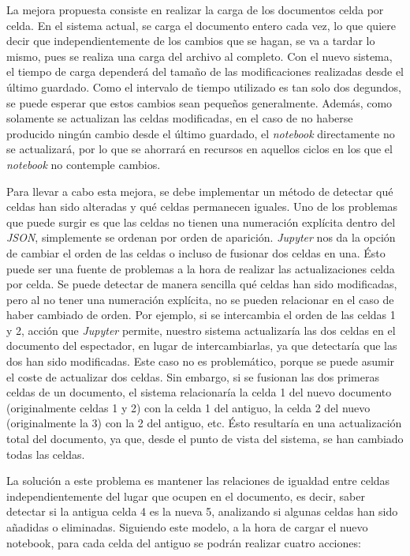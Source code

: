 \documentclass[11pt,spanish,listoffigures]{tfgetsinf}
\begin{document}
La mejora propuesta consiste en realizar la carga de los documentos celda por celda. En el sistema actual, se carga el documento entero cada vez, lo que quiere decir que independientemente de los cambios que se hagan, se va a tardar lo mismo, pues se realiza una carga del archivo al completo. Con el nuevo sistema, el tiempo de carga dependerá del tamaño de las modificaciones realizadas desde el último guardado. Como el intervalo de tiempo utilizado es tan solo dos degundos, se puede esperar que estos cambios sean pequeños generalmente. Además, como solamente se actualizan las celdas modificadas, en el caso de no haberse producido ningún cambio desde el último guardado, el \textit{notebook} directamente no se actualizará, por lo que se ahorrará en recursos en aquellos  ciclos en los que el \textit{notebook} no contemple cambios.

Para llevar a cabo esta mejora, se debe implementar un método de detectar qué celdas han sido alteradas y qué celdas permanecen iguales. Uno de los problemas que puede surgir es que las celdas no tienen una numeración explícita dentro del \textit{JSON}, simplemente se ordenan por orden de aparición. \textit{Jupyter} nos da la opción de cambiar el orden de las celdas o incluso de fusionar dos celdas en una. Ésto puede ser una fuente de problemas a la hora de realizar las actualizaciones celda por celda. Se puede detectar de manera sencilla qué celdas han sido modificadas, pero al no tener una numeración explícita, no se pueden relacionar en el caso de haber cambiado de orden. Por ejemplo, si se intercambia el orden de las celdas 1 y 2, acción que \textit{Jupyter} permite, nuestro sistema actualizaría las dos celdas en el documento del espectador, en lugar de intercambiarlas, ya que detectaría que las dos han sido modificadas. Este caso no es problemático, porque se puede asumir el coste de actualizar dos celdas. Sin embargo, si se fusionan las dos primeras celdas de un documento, el sistema relacionaría la celda 1 del nuevo documento (originalmente celdas 1 y 2) con la celda 1 del antiguo, la celda 2 del nuevo (originalmente la 3) con la 2 del antiguo, etc. Ésto resultaría en una actualización total del documento, ya que, desde el punto de vista del sistema, se han cambiado todas las celdas. 

La solución a este problema es mantener las relaciones de igualdad entre celdas independientemente del lugar que ocupen en el documento, es decir, saber detectar si la antigua celda 4 es la nueva 5, analizando si algunas celdas han sido añadidas o eliminadas. Siguiendo este modelo, a la hora de cargar el nuevo notebook, para cada celda del antiguo se podrán realizar cuatro acciones:
\end{document}
